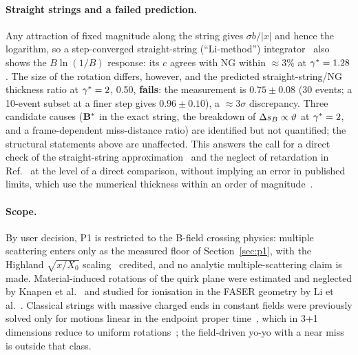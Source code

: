 \paragraph{Straight strings and a failed prediction.} Any attraction of fixed magnitude along the string gives
$\sigma b/|x|$ and hence the logarithm, so a step-converged straight-string (``Li-method'') integrator~\cite{Li:2019wce,Li:2020aoq}
also shows the $B\ln(1/B)$ response: its $c$ agrees with NG within $\approx3\%$ at $\gamma^*=1.28$. The size of the
rotation differs, however, and the predicted straight-string/NG thickness ratio at $\gamma^*=2$, 0.50, \textbf{fails}: the
measurement is $0.75\pm0.08$ (30 events; a 10-event subset at a finer step gives $0.96\pm0.10$), a $\approx3\sigma$
discrepancy. Three candidate causes ($\mathbf{B}^*$ in the exact string, the breakdown of $\Delta s_B\propto\vartheta$ at $\gamma^*=2$, and a
frame-dependent miss-distance ratio) are identified but not quantified; the structural statements above are unaffected.
This answers the call for a direct check of the straight-string approximation~\cite[Sec.~3.2]{Kang:2008ea} and the
neglect of retardation in Ref.~\cite[Sec.~2]{Evans:2018jmd} at the level of a direct comparison, without implying an
error in published limits, which use the numerical thickness within an order of magnitude~\cite[App.~C]{Li:2020aoq}.

\paragraph{Scope.} By user decision, P1 is restricted to the B-field crossing physics: multiple scattering enters only as
the measured floor of Section~\ref{sec:p1}, with the Highland $\sqrt{x/X_0}$ scaling~\cite{Highland:1975pq,ParticleDataGroup:2024cfk}
credited, and no analytic multiple-scattering claim is made. Material-induced rotations of the quirk plane were estimated
and neglected by Knapen et al.~\cite[Sec.~II]{Knapen:2017kly} and studied for ionisation in the FASER geometry by Li et
al.~\cite[Sec.~4.1]{Li:2021tsy}. Classical strings with massive charged ends in constant fields were previously solved
only for motions linear in the endpoint proper time~\cite{Barbashov:1977tv}, which in 3+1 dimensions reduce to uniform
rotations~\cite{Petrov:1996wz}; the field-driven yo-yo with a near miss is outside that class.

